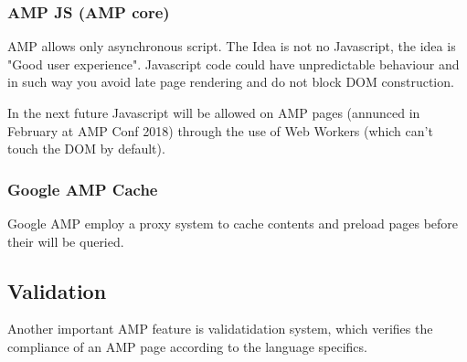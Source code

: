 \documentclass[a4paper]{article}
\begin{document}
    \subsubsection{AMP JS (AMP core)}
    AMP allows only asynchronous script. The Idea is not no Javascript, the idea is "Good user experience".
    Javascript code could have unpredictable behaviour and in such way you avoid late page rendering and do not block DOM construction.
    
    In the next future Javascript will be allowed on AMP pages (annunced in February at AMP Conf 2018) through the use of Web Workers (which can't touch the DOM by default).
    
    \subsubsection{Google AMP Cache}
    Google AMP employ a proxy system to cache contents and preload pages before their will be queried.
    
    \subsection{Validation}
    Another important AMP feature is validatidation system, which verifies the compliance of an AMP page according to the language specifics.

\end{document}
